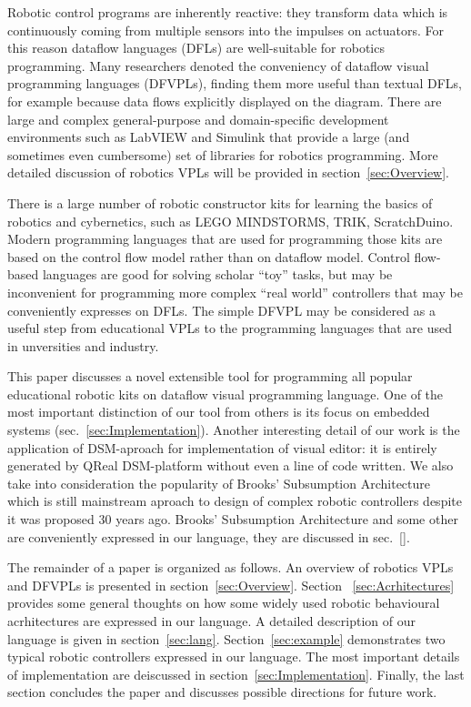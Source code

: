 \documentclass[conference,compsoc]{IEEEtran}
\begin{document}
Robotic control programs are inherently reactive: they transform data which is continuously coming from multiple sensors into the impulses on actuators. For this reason dataflow languages (DFLs) are well-suitable for robotics programming. Many researchers denoted the conveniency of dataflow visual programming languages (DFVPLs)\cite{johnston2004advances}, finding them more useful than textual DFLs, for example because data flows explicitly displayed on the diagram. There are large and complex general-purpose and domain-specific development environments such as LabVIEW\cite{labview} and Simulink\cite{simulink} that provide a large (and sometimes even cumbersome) set of libraries for robotics programming. More detailed discussion of robotics VPLs will be provided in section~\ref{sec:Overview}.

There is a large number of robotic constructor kits for learning the basics of robotics and cybernetics, such as LEGO MINDSTORMS\cite{legokit}, TRIK, ScratchDuino\cite{http://www.scratchduino.com/}. Modern programming languages that are used for programming those kits are based on the control flow model rather than on dataflow model. Control flow-based languages are good for solving scholar ``toy'' tasks, but may be inconvenient for programming more complex ``real world'' controllers that may be conveniently expresses on DFLs. The simple DFVPL may be considered as a useful step from educational VPLs to the programming languages that are used in unversities and industry. 


This paper discusses a novel extensible tool for programming all popular educational robotic kits on dataflow visual programming language. One of the most important distinction of our tool from others is its focus on embedded systems (sec.~\ref{sec:Implementation}). Another interesting detail of our work is the application of DSM-aproach for implementation of visual editor: it is entirely generated by QReal DSM-platform\cite{qrealMeta}\cite{kuzenkova2013qreal} without even a line of code written. We also take into consideration the popularity of Brooks' Subsumption Architecture\cite{brooks1986robust} which is still mainstream aproach to design of complex robotic controllers\cite{banyasad2000visual,simpson2006mobile,posso2011process,proetzsch2007behaviour} despite it was proposed 30 years ago. Brooks' Subsumption Architecture and some other are conveniently expressed in our language, they are discussed in sec.~\ref{}.

The remainder of a paper is organized as follows. An overview of robotics VPLs and DFVPLs is presented in section~\ref{sec:Overview}. Section ~\ref{sec:Acrhitectures} provides some general thoughts on how some widely used robotic behavioural acrhitectures are expressed in our language. A detailed description of our language is given in section~\ref{sec:lang}. Section~\ref{sec:example} demonstrates two typical robotic controllers expressed in our language. The most important details of implementation are deiscussed in section~\ref{sec:Implementation}. Finally, the last section concludes the paper and discusses possible directions for future work.
\end{document}
